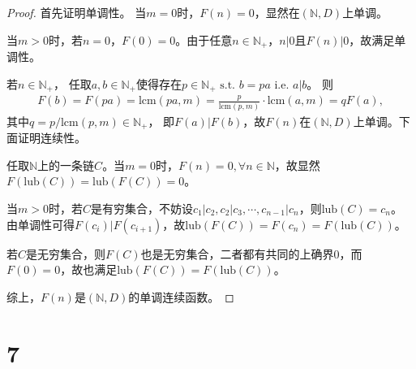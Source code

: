 \documentclass[12pt]{article}
\newcommand{\N}{\mathbb{N}}
\newcommand{\lub}{\textrm{lub}}
\begin{document}
    \begin{proof}
      首先证明单调性。
      当$m=0$时，$F(n)=0$，显然在$(\mathbb{N},D)$上单调。

      当$m>0$时，若$n=0$，$F(0)=0$。由于任意$n\in\mathbb{N}_+$，$n | 0$且$F(n) | 0$，故满足单调性。

      若$n \in \mathbb{N}_+$，
      任取$a,b \in \mathbb{N}_+$使得存在$p\in\mathbb{N}_+\text{ s.t. }b=pa\text{ i.e. }a|b$。
      则
      \begin{gather*}
        F(b) = F(pa) = \textrm{lcm}(pa,m) = \frac{p}{\textrm{lcm}(p,m)} \cdot \textrm{lcm}(a,m) = qF(a),
      \end{gather*}
      其中$q=p/\textrm{lcm}(p,m)\in\mathbb{N}_+$，
      即$F(a) | F(b)$，故$F(n)$在$(\mathbb{N},D)$上单调。下面证明连续性。

      任取$\N$上的一条链$C$。当$m=0$时，$F(n)=0,\forall n\in\N$，故显然$F(\lub(C))=\lub(F(C))=0$。

      当$m>0$时，若$C$是有穷集合，不妨设$c_1 | c_2, c_2 | c_3, \cdots, c_{n-1} | c_n$，则$\lub(C)=c_n$。
      由单调性可得$F(c_i) | F(c_{i+1})$，故$\lub(F(C))=F(c_n)=F(\lub(C))$。

      若$C$是无穷集合，则$F(C)$也是无穷集合，二者都有共同的上确界$0$，而$F(0)=0$，故也满足$\lub(F(C))=F(\lub(C))$。

      综上，$F(n)$是$(\N,D)$的单调连续函数。
    \end{proof}

  \section*{7}
\end{document}
